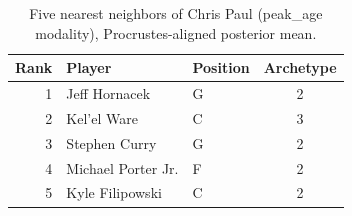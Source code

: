\begin{table}[htbp]
  \centering\small
  \begin{tabular}{rllc}
    \toprule
    Rank & Player & Position & Archetype \\
    \midrule
    1 & Jeff Hornacek & G & 2 \\
    2 & Kel'el Ware & C & 3 \\
    3 & Stephen Curry & G & 2 \\
    4 & Michael Porter Jr. & F & 2 \\
    5 & Kyle Filipowski & C & 2 \\
    \bottomrule
  \end{tabular}
  \caption{Five nearest neighbors of Chris Paul (peak_age modality), Procrustes-aligned posterior mean.}
  \label{tab:Chris_Paul_neighbors_peak_age}
\end{table}

